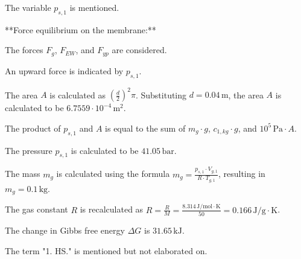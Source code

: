 The variable \( p_{s,1} \) is mentioned.

**Force equilibrium on the membrane:**

The forces \( F_g \), \( F_{EW} \), and \( F_{yp} \) are considered.

An upward force is indicated by \( p_{s,1} \).

The area \( A \) is calculated as \( \left(\frac{d}{2}\right)^2 \pi \). Substituting \( d = 0.04 \, \text{m} \), the area \( A \) is calculated to be \( 6.7559 \cdot 10^{-4} \, \text{m}^2 \).

The product of \( p_{s,1} \) and \( A \) is equal to the sum of \( m_g \cdot g \), \( c_{1,kg} \cdot g \), and \( 10^5 \, \text{Pa} \cdot A \).

The pressure \( p_{s,1} \) is calculated to be \( 41.05 \, \text{bar} \).

The mass \( m_g \) is calculated using the formula \( m_g = \frac{p_{s,1} \cdot V_{g,1}}{R \cdot T_{g,1}} \), resulting in \( m_g = 0.1 \, \text{kg} \).

The gas constant \( R \) is recalculated as \( R = \frac{R}{M} = \frac{8.314 \, \text{J/mol} \cdot \text{K}}{50} = 0.166 \, \text{J/g} \cdot \text{K} \).

The change in Gibbs free energy \( \Delta G \) is \( 31.65 \, \text{kJ} \).

The term "1. HS." is mentioned but not elaborated on.